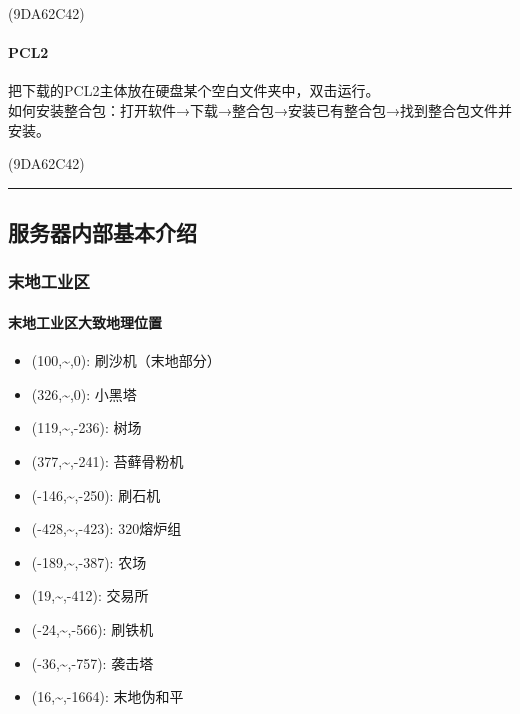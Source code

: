 \documentclass[
]{article}
\providecommand{\tightlist}{%
  \setlength{\itemsep}{0pt}\setlength{\parskip}{0pt}}
\begin{document}
\begin{flushright}(9DA62C42)\end{flushright}

\paragraph{PCL2}\label{pcl2}

把下载的PCL2主体放在硬盘某个空白文件夹中，双击运行。\\
如何安装整合包：打开软件→下载→整合包→安装已有整合包→找到整合包文件并安装。

\begin{flushright}(9DA62C42)\end{flushright}

\begin{center}\rule{0.5\linewidth}{0.5pt}\end{center}

\subsection{服务器内部基本介绍}\label{section-22}

\subsubsection{末地工业区}\label{section-23}

\paragraph{末地工业区大致地理位置}\label{section-24}

\begin{itemize}
\tightlist
\item
  (100,\textasciitilde,0): 刷沙机（末地部分）
\item
  (326,\textasciitilde,0): 小黑塔
\item
  (119,\textasciitilde,-236): 树场
\item
  (377,\textasciitilde,-241): 苔藓骨粉机
\item
  (-146,\textasciitilde,-250): 刷石机
\item
  (-428,\textasciitilde,-423): 320熔炉组
\item
  (-189,\textasciitilde,-387): 农场
\item
  (19,\textasciitilde,-412): 交易所
\item
  (-24,\textasciitilde,-566): 刷铁机
\item
  (-36,\textasciitilde,-757): 袭击塔
\item
  (16,\textasciitilde,-1664): 末地伪和平
\end{itemize}
\end{document}
